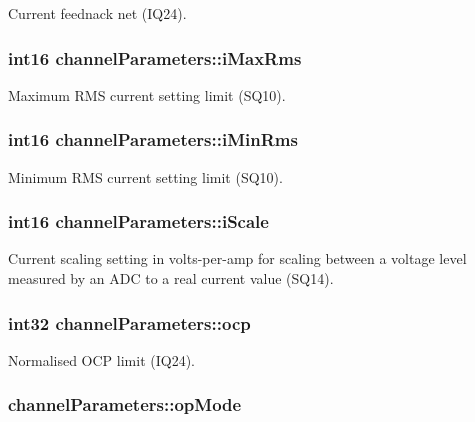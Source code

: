 Current feednack net (I\-Q24). \hypertarget{a00003_ab4b8dda9d3ab4395a3fde8bc0e403212}{
\subsubsection[{i\-Max\-Rms}]{\setlength{\rightskip}{0pt plus 5cm}int16 channel\-Parameters\-::i\-Max\-Rms}}\label{a00003_ab4b8dda9d3ab4395a3fde8bc0e403212}
Maximum R\-M\-S current setting limit (S\-Q10). \hypertarget{a00003_a12f6946f5b0ee1235d7edcb6a22a4518}{
\subsubsection[{i\-Min\-Rms}]{\setlength{\rightskip}{0pt plus 5cm}int16 channel\-Parameters\-::i\-Min\-Rms}}\label{a00003_a12f6946f5b0ee1235d7edcb6a22a4518}
Minimum R\-M\-S current setting limit (S\-Q10). \hypertarget{a00003_a022031c9e8a34b37c6cd05d8d7934a13}{
\subsubsection[{i\-Scale}]{\setlength{\rightskip}{0pt plus 5cm}int16 channel\-Parameters\-::i\-Scale}}\label{a00003_a022031c9e8a34b37c6cd05d8d7934a13}
Current scaling setting in volts-\/per-\/amp for scaling between a voltage level measured by an A\-D\-C to a real current value (S\-Q14). \hypertarget{a00003_a95bd86963045f10f75c656956a09858c}{
\subsubsection[{ocp}]{\setlength{\rightskip}{0pt plus 5cm}int32 channel\-Parameters\-::ocp}}\label{a00003_a95bd86963045f10f75c656956a09858c}
Normalised O\-C\-P limit (I\-Q24). \hypertarget{a00003_a25d490fa4d7487c8e2e21c1400a6b99b}{
\subsubsection[{op\-Mode}]{ channel\-Parameters\-::op\-Mode}}\label{a00003_a25d490fa4d7487c8e2e21c1400a6b99b}

